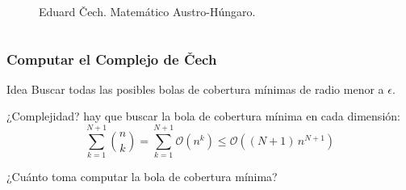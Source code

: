 \documentclass{beamer}
\newcommand{\OO}{\mathcal{O}}
\begin{document}
\begin{frame}
\begin{columns}
  \begin{figure}[H]
    \centering
    \caption{Eduard \v{C}ech. Matemático Austro-Húngaro.}
  \end{figure}
\end{columns}
\end{frame}

\begin{frame}\frametitle{Computar el Complejo de \v{C}ech}
\begin{block}{Idea}
  Buscar todas las posibles bolas de cobertura mínimas de radio menor a \(\epsilon\).
\end{block}

\pause%
¿Complejidad? hay que buscar la bola de cobertura mínima en cada dimensión:
\begin{displaymath}
  \sum_{k=1}^{N+1} {n\choose k}
  =
  \sum_{k=1}^{N+1} \OO(n^k)
  \le
  \OO((N+1)\, n^{N+1})
\end{displaymath}

\pause%
¿Cuánto toma computar la bola de cobertura mínima?
\end{frame}
\end{document}
